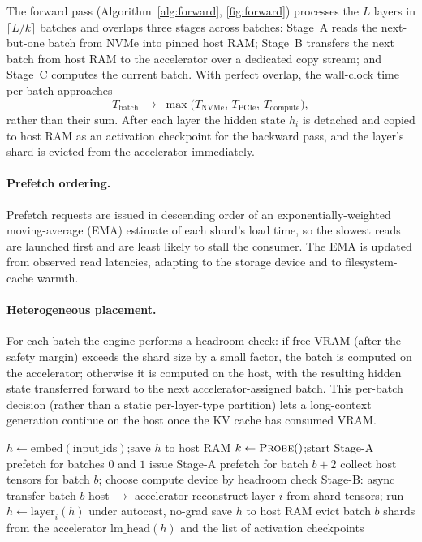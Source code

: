 \documentclass{article}
\begin{document}
The forward pass (Algorithm~\ref{alg:forward}, \autoref{fig:forward}) processes
the $L$ layers in $\lceil L/k\rceil$ batches and overlaps three stages across
batches: Stage~A reads the next-but-one batch from NVMe into pinned host RAM;
Stage~B transfers the next batch from host RAM to the accelerator over a
dedicated copy stream; and Stage~C computes the current batch. With perfect
overlap, the wall-clock time per batch approaches
\begin{equation}
  T_{\mathrm{batch}} \;\to\; \max\big(T_{\mathrm{NVMe}},\, T_{\mathrm{PCIe}},\, T_{\mathrm{compute}}\big),
  \label{eq:overlap}
\end{equation}
rather than their sum. After each layer the hidden state $h_i$ is detached and
copied to host RAM as an activation checkpoint for the backward pass, and the
layer's shard is evicted from the accelerator immediately.

\paragraph{Prefetch ordering.} Prefetch requests are issued in descending order
of an exponentially-weighted moving-average (EMA) estimate of each shard's load
time, so the slowest reads are launched first and are least likely to stall the
consumer. The EMA is updated from observed read latencies, adapting to the
storage device and to filesystem-cache warmth.

\paragraph{Heterogeneous placement.} For each batch the engine performs a
headroom check: if free VRAM (after the safety margin) exceeds the shard size by
a small factor, the batch is computed on the accelerator; otherwise it is
computed on the host, with the resulting hidden state transferred forward to the
next accelerator-assigned batch. This per-batch decision (rather than a static
per-layer-type partition) lets a long-context generation continue on the host
once the KV cache has consumed VRAM.

\begin{algorithm}[t]
\caption{Three-stage forward pass}
\label{alg:forward}
\begin{algorithmic}[1]
\State $h \gets \mathrm{embed}(\text{input\_ids})$;\quad save $h$ to host RAM
\State $k \gets \textsc{Probe}()$;\quad start Stage-A prefetch for batches $0$ and $1$
  \State issue Stage-A prefetch for batch $b{+}2$ 
  \State collect host tensors for batch $b$; choose compute device by headroom check
  \State Stage-B: async transfer batch $b$ host $\rightarrow$ accelerator
     \State reconstruct layer $i$ from shard tensors; run $h \gets \mathrm{layer}_i(h)$ under autocast, no-grad
     \State save $h$ to host RAM 
  \EndFor
  \State evict batch $b$ shards from the accelerator
\EndFor
\State \Return $\mathrm{lm\_head}(h)$ and the list of activation checkpoints
\end{algorithmic}
\end{algorithm}
\end{document}
